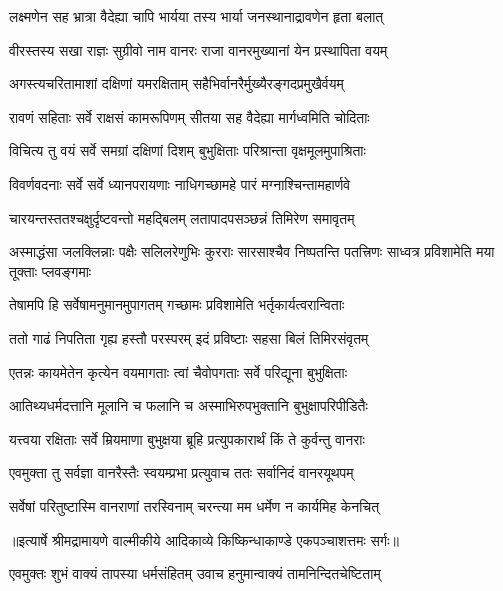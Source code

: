 \twolineshloka
{लक्ष्मणेन सह भ्रात्रा वैदेह्या चापि भार्यया}
{तस्य भार्या जनस्थानाद्रावणेन हृता बलात्} %

\twolineshloka
{वीरस्तस्य सखा राज्ञः सुग्रीवो नाम वानरः}
{राजा वानरमुख्यानां येन प्रस्थापिता वयम्} %

\twolineshloka
{अगस्त्यचरितामाशां दक्षिणां यमरक्षिताम्}
{सहैभिर्वानरैर्मुख्यैरङ्गदप्रमुखैर्वयम्} %

\twolineshloka
{रावणं सहिताः सर्वे राक्षसं कामरूपिणम्}
{सीतया सह वैदेह्या मार्गध्वमिति चोदिताः} %

\twolineshloka
{विचित्य तु वयं सर्वे समग्रां दक्षिणां दिशम्}
{बुभुक्षिताः परिश्रान्ता वृक्षमूलमुपाश्रिताः} %

\twolineshloka
{विवर्णवदनाः सर्वे सर्वे ध्यानपरायणाः}
{नाधिगच्छामहे पारं मग्नाश्चिन्तामहार्णवे} %

\twolineshloka
{चारयन्तस्ततश्चक्षुर्दृष्टवन्तो महद्बिलम्}
{लतापादपसञ्छन्नं तिमिरेण समावृतम्} %

\threelineshloka
{अस्माद्धंसा जलक्लिन्नाः पक्षैः सलिलरेणुभिः}
{कुरराः सारसाश्चैव निष्पतन्ति पतत्त्रिणः}
{साध्वत्र प्रविशामेति मया तूक्ताः प्लवङ्गमाः} %

\twolineshloka
{तेषामपि हि सर्वेषामनुमानमुपागतम्}
{गच्छामः प्रविशामेति भर्तृकार्यत्वरान्विताः} %

\twolineshloka
{ततो गाढं निपतिता गृह्य हस्तौ परस्परम्}
{इदं प्रविष्टाः सहसा बिलं तिमिरसंवृतम्} %

\twolineshloka
{एतन्नः कायमेतेन कृत्येन वयमागताः}
{त्वां चैवोपगताः सर्वे परिद्यूना बुभुक्षिताः} %

\twolineshloka
{आतिथ्यधर्मदत्तानि मूलानि च फलानि च}
{अस्माभिरुपभुक्तानि बुभुक्षापरिपीडितैः} %

\twolineshloka
{यत्त्वया रक्षिताः सर्वे म्रियमाणा बुभुक्षया}
{ब्रूहि प्रत्युपकारार्थं किं ते कुर्वन्तु वानराः} %

\twolineshloka
{एवमुक्ता तु सर्वज्ञा वानरैस्तैः स्वयम्प्रभा}
{प्रत्युवाच ततः सर्वानिदं वानरयूथपम्} %

\twolineshloka
{सर्वेषां परितुष्टास्मि वानराणां तरस्विनाम्}
{चरन्त्या मम धर्मेण न कार्यमिह केनचित्} %


{॥इत्यार्षे श्रीमद्रामायणे वाल्मीकीये आदिकाव्ये किष्किन्धाकाण्डे एकपञ्चाशत्तमः सर्गः॥}


\twolineshloka
{एवमुक्तः शुभं वाक्यं तापस्या धर्मसंहितम्}
{उवाच हनुमान्वाक्यं तामनिन्दितचेष्टिताम्} %

